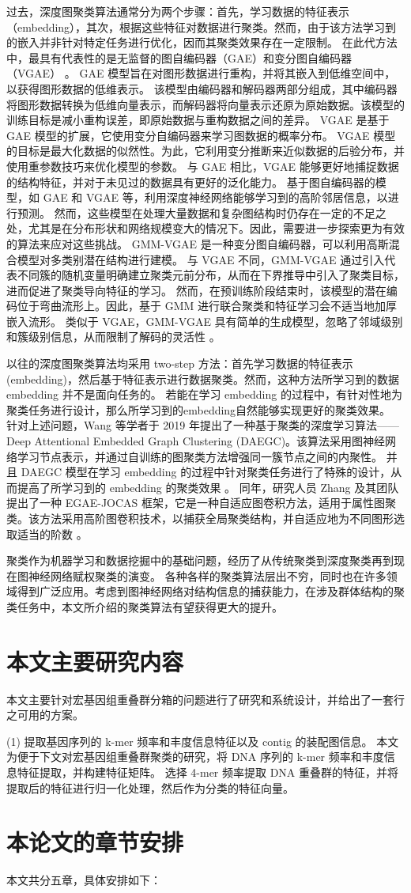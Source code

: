 过去，深度图聚类算法通常分为两个步骤：首先，学习数据的特征表示（embedding），其次，根据这些特征对数据进行聚类。然而，由于该方法学习到的嵌入并非针对特定任务进行优化，因而其聚类效果存在一定限制。
在此代方法中，最具有代表性的是无监督的图自编码器（GAE）和变分图自编码器（VGAE） \cite{kipf2016variational}。
GAE 模型旨在对图形数据进行重构，并将其嵌入到低维空间中，以获得图形数据的低维表示。
该模型由编码器和解码器两部分组成，其中编码器将图形数据转换为低维向量表示，而解码器将向量表示还原为原始数据。该模型的训练目标是减小重构误差，即原始数据与重构数据之间的差异。
VGAE 是基于 GAE 模型的扩展，它使用变分自编码器来学习图数据的概率分布。
VGAE 模型的目标是最大化数据的似然性。为此，它利用变分推断来近似数据的后验分布，并使用重参数技巧来优化模型的参数。
与 GAE 相比，VGAE 能够更好地捕捉数据的结构特征，并对于未见过的数据具有更好的泛化能力。
基于图自编码器的模型，如 GAE 和 VGAE 等，利用深度神经网络能够学习到的高阶邻居信息，以进行预测。
然而，这些模型在处理大量数据和复杂图结构时仍存在一定的不足之处，尤其是在分布形状和网络规模变大的情况下。因此，需要进一步探索更为有效的算法来应对这些挑战。
GMM-VGAE 是一种变分图自编码器，可以利用高斯混合模型对多类别潜在结构进行建模。
与 VGAE 不同，GMM-VGAE 通过引入代表不同簇的随机变量明确建立聚类元前分布，从而在下界推导中引入了聚类目标，进而促进了聚类导向特征的学习。
然而，在预训练阶段结束时，该模型的潜在编码位于弯曲流形上。因此，基于 GMM 进行联合聚类和特征学习会不适当地加厚嵌入流形。
类似于 VGAE，GMM-VGAE 具有简单的生成模型，忽略了邻域级别和簇级别信息，从而限制了解码的灵活性 \cite{mrabah2022rethinking}。

以往的深度图聚类算法均采用 two-step 方法：首先学习数据的特征表示(embedding)，然后基于特征表示进行数据聚类。然而，这种方法所学习到的数据 embedding 并不是面向任务的。
若能在学习 embedding 的过程中，有针对性地为聚类任务进行设计，那么所学习到的embedding自然能够实现更好的聚类效果。
针对上述问题，Wang 等学者于 2019 年提出了一种基于聚类的深度学习算法——Deep Attentional Embedded Graph Clustering (DAEGC)。该算法采用图神经网络学习节点表示，并通过自训练的图聚类方法增强同一簇节点之间的内聚性。
并且 DAEGC 模型在学习 embedding 的过程中针对聚类任务进行了特殊的设计，从而提高了所学习到的 embedding 的聚类效果 \cite{wang2019attributed}。
同年，研究人员 Zhang 及其团队提出了一种 EGAE-JOCAS 框架，它是一种自适应图卷积方法，适用于属性图聚类。该方法采用高阶图卷积技术，以捕获全局聚类结构，并自适应地为不同图形选取适当的阶数 \cite{zhang2019attributed}。

聚类作为机器学习和数据挖掘中的基础问题，经历了从传统聚类到深度聚类再到现在图神经网络赋权聚类的演变。
各种各样的聚类算法层出不穷，同时也在许多领域得到广泛应用。考虑到图神经网络对结构信息的捕获能力，在涉及群体结构的聚类任务中，本文所介绍的聚类算法有望获得更大的提升。

\section{本文主要研究内容}
本文主要针对宏基因组重叠群分箱的问题进行了研究和系统设计，并给出了一套行之可用的方案。

(1) 提取基因序列的 k-mer 频率和丰度信息特征以及 contig 的装配图信息。
本文为便于下文对宏基因组重叠群聚类的研究，将 DNA 序列的 k-mer 频率和丰度信息特征提取，并构建特征矩阵。
选择 4-mer 频率提取 DNA 重叠群的特征，并将提取后的特征进行归一化处理，然后作为分类的特征向量。

\section{本论文的章节安排}
本文共分五章，具体安排如下：


